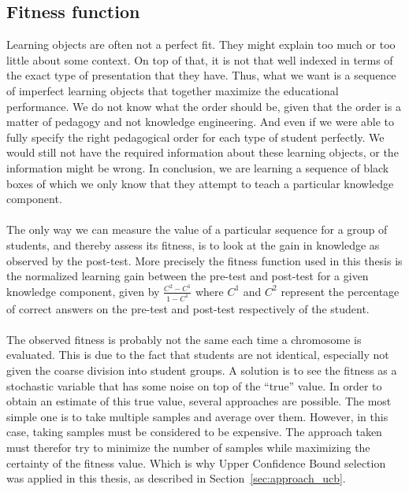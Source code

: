 \subsection{Fitness function}
Learning objects are often not a perfect fit. They might explain too much or too
little about some context. On top of that, it is not that well indexed in terms of the
exact type of presentation that they have. Thus, what we want is a
sequence of imperfect learning objects that together maximize the
educational performance. We do not know what the order should be, given
that the order is a matter of pedagogy and not knowledge engineering.
And even if we were able to fully specify the right pedagogical order
for each type of student perfectly. We would still not have the
required information about these learning objects, or the information
might be wrong. In conclusion, we are learning a sequence of black
boxes of which we only know that they attempt to teach a particular
knowledge component.\\\\
\noindent
The only way we can measure the value of a particular sequence for a
group of students, and thereby assess its fitness, is to look at the
gain in knowledge as observed by the post-test. More precisely the fitness
function used in this thesis is the normalized learning gain between the
pre-test and post-test for a given knowledge component, given by $\frac{C^2 -
C^1}{1-C^1}$ where $C^1$ and $C^2$ represent the percentage of correct answers
on the pre-test and post-test respectively of the student.\\\\
\noindent
The observed fitness is probably not the same each time a chromosome
is evaluated. This is due to the fact that students are not identical,
especially not given the coarse division into student groups. A solution
is to see the fitness as a stochastic variable that has some noise on
top of the ``true'' value. In order to obtain an estimate of this true
value, several approaches are possible. The most simple one is to take
multiple samples and average over them. However, in this case, taking
samples must be considered to be expensive. The approach taken must
therefor try to minimize the number of samples while maximizing the
certainty of the fitness value. Which is why Upper Confidence Bound selection
was applied in this thesis, as described in Section~\ref{sec:approach_ucb}.

